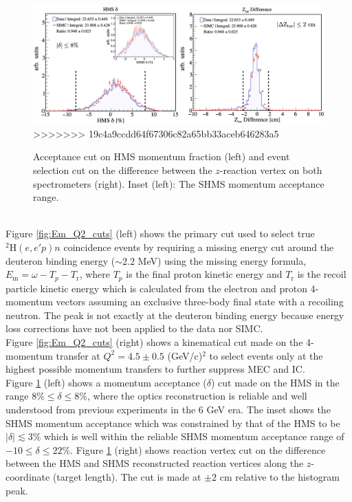 \documentclass[aps, prl]{revtex4-2}  %
\providecommand{\DIFaddbeginFL}{} %
\providecommand{\DIFaddendFL}{} %
\providecommand{\DIFdelendFL}{} %
\newcommand{\DIFaddincludegraphics}[2][]{{\color{blue}\fbox{\DIFOincludegraphics[#1]{#2}}}} %
\DeclareRobustCommand{\DIFaddbeginFL}{\DIFOaddbeginFL \let\includegraphics\DIFaddincludegraphics} %
\DeclareRobustCommand{\DIFaddendFL}{\DIFOaddendFL \let\includegraphics\DIFOincludegraphics} %
\DeclareRobustCommand{\DIFdelendFL}{\DIFOaddendFL \let\includegraphics\DIFOincludegraphics} %
\begin{document}
\begin{figure}[!h]
\DIFdelendFL \DIFaddbeginFL \includegraphics[scale=0.33]{plots/deltaAcc_and_ZtarCUT_80MeV_35deg.png}
>>>>>>> 19c4a9ccdd64f67306c82a65bb33aceb646283a5
\DIFaddendFL \caption{Acceptance cut on HMS momentum fraction (left) and event selection cut on the difference between the $z$-reaction vertex on both spectrometers (right).
  Inset (left): The SHMS momentum acceptance range.}
\label{fig:delta_Ztar_cuts}
\end{figure}\\
\indent Figure \ref{fig:Em_Q2_cuts} (left) shows the primary cut used to select true $^{2}\mathrm{H}(e,e'p)n$ coincidence events by requiring a missing
energy cut around the deuteron binding energy ($\sim$2.2 MeV) using the missing energy formula, $E_{\mathrm{m}} = \omega - T_{p} - T_{\mathrm{r}}$, where
$T_{p}$ is the final proton kinetic energy and $T_{\mathrm{r}}$ is the recoil particle kinetic energy which is calculated from the electron and proton
4-momentum vectors assuming an exclusive three-body final state with a recoiling neutron. The peak is not exactly at the deuteron binding energy because
energy loss corrections have not been applied to the data nor SIMC. \\
\indent Figure \ref{fig:Em_Q2_cuts} (right) shows a
kinematical cut made on the 4-momentum transfer at $Q^{2} = 4.5\pm0.5$ (GeV/c)$^{2}$
to select events only at the highest possible momentum transfers to further suppress MEC and IC. \\
\indent Figure \ref{fig:delta_Ztar_cuts} (left) shows a momentum acceptance ($\delta$) cut made on the HMS in the range $8\%\leq\delta\leq8\%$, where the optics reconstruction
is reliable and well understood from previous experiments in the 6 GeV era. The inset shows the SHMS momentum acceptance which was constrained by that of the HMS to be
$|\delta|\lesssim$3$\%$ which is well within the reliable SHMS momentum acceptance range of $-10 \leq \delta \leq22 \%$. Figure \ref{fig:delta_Ztar_cuts} (right) shows reaction vertex cut
on the difference between the HMS and SHMS reconstructed reaction vertices along the $z$-coordinate (target length). The cut is made at $\pm2$ cm relative to the histogram peak.
\end{document}
